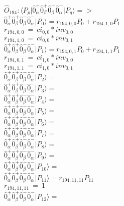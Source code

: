 \documentclass[14pt]{article}
\begin{document}
    $\hat{O}_{194}:  \langle{P_p}\vert \hat{0}_{\alpha}^{+}\hat{0}_{\beta}^{+}\hat{0}_{\beta}^{-}\hat{0}_{\alpha}^{-} \vert{P_q}\rangle => $ \\ 
    $ \hat{0}_{\alpha}^{+}\hat{0}_{\beta}^{+}\hat{0}_{\beta}^{-}\hat{0}_{\alpha}^{-} \vert{P_{0}}\rangle = {r}_{194,0,0}P_{0}+{r}_{194,1,0}P_{1} $ \\ 
    ${r}_{194,0,0}\ =\ {ci}_{0,0}*{inv}_{0,0} $ \\ 
    ${r}_{194,1,0}\ =\ {ci}_{0,0}*{inv}_{0,1} $ \\ 
    $ \hat{0}_{\alpha}^{+}\hat{0}_{\beta}^{+}\hat{0}_{\beta}^{-}\hat{0}_{\alpha}^{-} \vert{P_{1}}\rangle = {r}_{194,0,1}P_{0}+{r}_{194,1,1}P_{1} $ \\ 
    ${r}_{194,0,1}\ =\ {ci}_{1,0}*{inv}_{0,0} $ \\ 
    ${r}_{194,1,1}\ =\ {ci}_{1,0}*{inv}_{0,1} $ \\ 
    $ \hat{0}_{\alpha}^{+}\hat{0}_{\beta}^{+}\hat{0}_{\beta}^{-}\hat{0}_{\alpha}^{-} \vert{P_{2}}\rangle =  $ \\ 
    $ \hat{0}_{\alpha}^{+}\hat{0}_{\beta}^{+}\hat{0}_{\beta}^{-}\hat{0}_{\alpha}^{-} \vert{P_{3}}\rangle =  $ \\ 
    $ \hat{0}_{\alpha}^{+}\hat{0}_{\beta}^{+}\hat{0}_{\beta}^{-}\hat{0}_{\alpha}^{-} \vert{P_{4}}\rangle =  $ \\ 
    $ \hat{0}_{\alpha}^{+}\hat{0}_{\beta}^{+}\hat{0}_{\beta}^{-}\hat{0}_{\alpha}^{-} \vert{P_{5}}\rangle =  $ \\ 
    $ \hat{0}_{\alpha}^{+}\hat{0}_{\beta}^{+}\hat{0}_{\beta}^{-}\hat{0}_{\alpha}^{-} \vert{P_{6}}\rangle =  $ \\ 
    $ \hat{0}_{\alpha}^{+}\hat{0}_{\beta}^{+}\hat{0}_{\beta}^{-}\hat{0}_{\alpha}^{-} \vert{P_{7}}\rangle =  $ \\ 
    $ \hat{0}_{\alpha}^{+}\hat{0}_{\beta}^{+}\hat{0}_{\beta}^{-}\hat{0}_{\alpha}^{-} \vert{P_{8}}\rangle =  $ \\ 
    $ \hat{0}_{\alpha}^{+}\hat{0}_{\beta}^{+}\hat{0}_{\beta}^{-}\hat{0}_{\alpha}^{-} \vert{P_{9}}\rangle =  $ \\ 
    $ \hat{0}_{\alpha}^{+}\hat{0}_{\beta}^{+}\hat{0}_{\beta}^{-}\hat{0}_{\alpha}^{-} \vert{P_{10}}\rangle =  $ \\ 
    $ \hat{0}_{\alpha}^{+}\hat{0}_{\beta}^{+}\hat{0}_{\beta}^{-}\hat{0}_{\alpha}^{-} \vert{P_{11}}\rangle = {r}_{194,11,11}P_{11} $ \\ 
    ${r}_{194,11,11}\ =\ 1 $ \\ 
    $ \hat{0}_{\alpha}^{+}\hat{0}_{\beta}^{+}\hat{0}_{\beta}^{-}\hat{0}_{\alpha}^{-} \vert{P_{12}}\rangle =  $ \\ 
\end{document}
